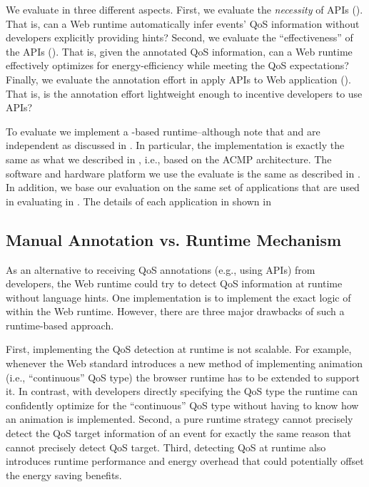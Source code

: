 We evaluate \greenweb in three different aspects. First, we evaluate the \textit{necessity} of \greenweb APIs (). That is, can a Web runtime automatically infer events' QoS information without developers explicitly providing hints? Second, we evaluate the ``effectiveness'' of the \greenweb APIs (). That is, given the annotated QoS information, can a Web runtime effectively optimizes for energy-efficiency while meeting the QoS expectations? Finally, we evaluate the annotation effort in apply \greenweb APIs to Web application (). That is, is the annotation effort lightweight enough to incentive developers to use \greenweb APIs?

To evaluate \greenweb we implement a \webrt-based \greenweb runtime--although note that \webrt and \greenweb are independent as discussed in . In particular, the \webrt implementation is exactly the same as what we described in , i.e., based on the ACMP architecture. The software and hardware platform we use the evaluate \greenweb is the same as described in . In addition, we base our evaluation on the same set of applications that are used in evaluating \ebs in . The details of each application in shown in 



\subsection{Manual Annotation vs. Runtime Mechanism}
\label{sec:lang:eval:need}

As an alternative to receiving QoS annotations (e.g., using \greenweb APIs) from developers, the Web runtime could try to detect QoS information at runtime without language hints. One implementation is to implement the exact logic of \autogreen within the Web runtime. However, there are three major drawbacks of such a runtime-based approach.

First, implementing the QoS detection at runtime is not scalable. For example, whenever the Web standard introduces a new method of implementing animation (i.e., ``continuous'' QoS type) the browser runtime has to be extended to support it. In contrast, with developers directly specifying the QoS type the runtime can confidently optimize for the ``continuous'' QoS type without having to know how an animation is implemented. Second, a pure runtime strategy cannot precisely detect the QoS target information of an event for exactly the same reason that \autogreen cannot precisely detect QoS target. Third, detecting QoS at runtime also introduces runtime performance and energy overhead that could potentially offset the energy saving benefits.

